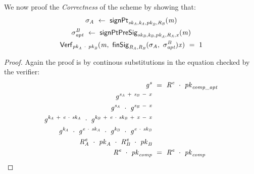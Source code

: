 We now proof the \textit{Correctness} of the scheme by showing that:~
\begin{gather}
    \sigma_{\mathit{A}} ~\leftarrow~ \mathsf{signPt}_{\mathit{sk}_{\mathit{A}},\mathit{\mathit{k}_{\mathit{A}}},\mathit{pk}_{\mathit{B}},\mathit{R}_{\mathit{B}}}(\mathit{m}) \\
    \sigma^{\mathit{B}}_{\mathit{apt}} ~\leftarrow~ \mathsf{signPtPreSig}_{\mathit{sk}_{\mathit{B}},\mathit{\mathit{k}_{\mathit{B}}},\mathit{pk}_{\mathit{A}},\mathit{R}_{\mathit{A}},\mathit{x}}(\mathit{m}) \\
    \mathsf{Verf}_{\mathit{pk}_{\mathit{A}} ~\cdot~ \mathit{pk}_{\mathit{B}}}(\mathit{m} ,~ \mathsf{finSig}_{\mathit{R}_{\mathit{A}},\mathit{R}_{\mathit{B}}}(\sigma_{\mathit{A}} ,~ \sigma^{\mathit{B}}_{\mathit{apt}}){\mathit{x}}) ~=~ 1
\end{gather}

\begin{proof}
    \label{prf:aptSchnorr}
    Again the proof is by continous substitutions in the equation checked by the verifier:
    \begin{align}
        \mathit{g}^{\mathit{s}} &~=~ \mathit{R}^{\mathit{e}} ~\cdot~ \mathit{pk}_{\mathit{comp\_apt}} \\
        \mathit{g}^{\mathit{s}_{\mathit{A}} ~+~ \mathit{s}_{\mathit{B}} ~-~ \mathit{x}} & \\
        \mathit{g}^{\mathit{s}_{\mathit{A}}} ~\cdot~ \mathit{g}^{\mathit{s}_{\mathit{B}} ~-~ \mathit{x}} & \\
        \mathit{g}^{\mathit{\mathit{k}_{\mathit{A}}} ~+~ \mathit{e} ~\cdot~ \mathit{sk}_{\mathit{A}}} ~\cdot~ \mathit{g}^{\mathit{\mathit{k}_{\mathit{B}}} ~+~ \mathit{e} ~\cdot~ \mathit{sk}_{\mathit{B}} ~+~ \mathit{x} ~-~ \mathit{x}} & \\
        \mathit{g}^{\mathit{\mathit{k}_{\mathit{A}}}} ~\cdot~ \mathit{g}^{\mathit{e} ~\cdot~ \mathit{sk}_{\mathit{A}}} ~\cdot~ \mathit{g}^{\mathit{\mathit{k}_{\mathit{B}}}} ~\cdot~ \mathit{g}^{\mathit{e} ~\cdot~ \mathit{sk}_{\mathit{B}}} & \\
        \mathit{R}_{\mathit{A}}^{\mathit{e}} ~\cdot~ \mathit{pk}_{\mathit{A}} ~\cdot~ \mathit{R}_{\mathit{B}}^{\mathit{e}} ~\cdot~ \mathit{pk}_{\mathit{B}} & \\
        \mathit{R}^{\mathit{e}} ~\cdot~ \mathit{pk}_{\mathit{comp}} & ~=~ \mathit{R}^{\mathit{e}} ~\cdot~ \mathit{pk}_{\mathit{comp}}
    \end{align}
\end{proof}

